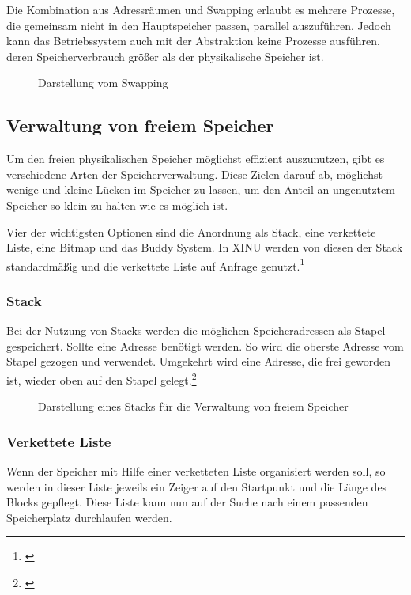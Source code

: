 Die Kombination aus Adressräumen und Swapping erlaubt es mehrere Prozesse, die gemeinsam nicht in den Hauptspeicher passen, parallel auszuführen. Jedoch kann das Betriebssystem auch mit der Abstraktion keine Prozesse ausführen, deren Speicherverbrauch größer als der physikalische Speicher ist.

\begin{figure}[htb]
	\centering
	\caption{Darstellung vom Swapping}
\end{figure}

\subsection{Verwaltung von freiem Speicher}
\label{subsec:VerwaltungFreiemSpeicher}
Um den freien physikalischen Speicher möglichst effizient auszunutzen, gibt es verschiedene Arten der Speicherverwaltung. Diese Zielen darauf ab, möglichst wenige und kleine Lücken im Speicher zu lassen, um den Anteil an ungenutztem Speicher so klein zu halten wie es möglich ist.

Vier der wichtigsten Optionen sind die Anordnung als Stack, eine verkettete Liste, eine Bitmap und das Buddy System. In XINU werden von diesen der Stack standardmäßig und die verkettete Liste auf Anfrage genutzt.\footnote{\cite[S.~157]{Comer.2015}}

\subsubsection{Stack}
Bei der Nutzung von Stacks werden die möglichen Speicheradressen als Stapel gespeichert. Sollte eine Adresse benötigt werden. So wird die oberste Adresse vom Stapel gezogen und verwendet. Umgekehrt wird eine Adresse, die frei geworden ist, wieder oben auf den Stapel gelegt.\footnote{\cite[S.~165]{Comer.2015}}

\begin{figure}[htb]
	\centering
	\caption{Darstellung eines Stacks für die Verwaltung von freiem Speicher}
\end{figure}

\subsubsection{Verkettete Liste}
Wenn der Speicher mit Hilfe einer verketteten Liste organisiert werden soll, so werden in dieser Liste jeweils ein Zeiger auf den Startpunkt und die Länge des Blocks gepflegt. Diese Liste kann nun auf der Suche nach einem passenden Speicherplatz durchlaufen werden. 


